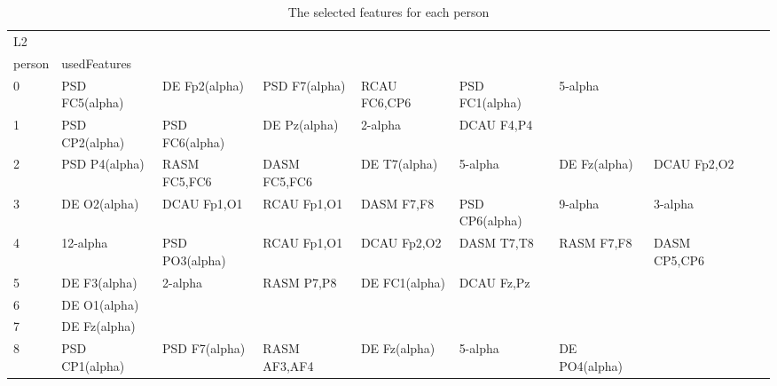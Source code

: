 \begin{landscape}
\begin{table}[]
\centering
\caption{The selected features for each person}
\begin{tabular}{l|llllllll}
L2       &                &                &                &                &                &                &               &                &               &               \\
person   & usedFeatures   &                &                &                &                &                &               &                &               &               \\
0        & PSD FC5(alpha) & DE Fp2(alpha)  & PSD F7(alpha)  & RCAU FC6,CP6   & PSD FC1(alpha) & 5-alpha        &               &                &               &               \\
1        & PSD CP2(alpha) & PSD FC6(alpha) & DE Pz(alpha)   & 2-alpha        & DCAU F4,P4     &                &               &                &               &               \\
2        & PSD P4(alpha)  & RASM FC5,FC6   & DASM FC5,FC6   & DE T7(alpha)   & 5-alpha        & DE Fz(alpha)   & DCAU Fp2,O2   &                &               &               \\
3        & DE O2(alpha)   & DCAU Fp1,O1    & RCAU Fp1,O1    & DASM F7,F8     & PSD CP6(alpha) & 9-alpha        & 3-alpha       &                &               &               \\
4        & 12-alpha       & PSD PO3(alpha) & RCAU Fp1,O1    & DCAU Fp2,O2    & DASM T7,T8     & RASM F7,F8     & DASM CP5,CP6  &                &               &               \\
5        & DE F3(alpha)   & 2-alpha        & RASM P7,P8     & DE FC1(alpha)  & DCAU Fz,Pz     &                &               &                &               &               \\
6        & DE O1(alpha)   &                &                &                &                &                &               &                &               &               \\
7        & DE Fz(alpha)   &                &                &                &                &                &               &                &               &               \\
8        & PSD CP1(alpha) & PSD F7(alpha)  & RASM AF3,AF4   & DE Fz(alpha)   & 5-alpha        & DE PO4(alpha)  &               &                &               &               \\

\end{tabular}
\end{table}
\end{landscape}
